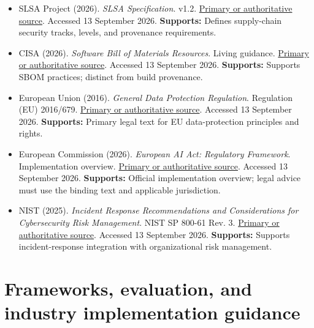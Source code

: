 \begin{itemize}
\item {}\textbf{} SLSA Project (2026). \emph{SLSA Specification}. v1.2. \href{\detokenize{https://slsa.dev/spec/v1.2}}{Primary or authoritative source}. Accessed 13 September 2026. \textbf{Supports:} Defines supply-chain security tracks, levels, and provenance requirements.

\item {}\textbf{} CISA (2026). \emph{Software Bill of Materials Resources}. Living guidance. \href{\detokenize{https://www.cisa.gov/sbom}}{Primary or authoritative source}. Accessed 13 September 2026. \textbf{Supports:} Supports SBOM practices; distinct from build provenance.

\item {}\textbf{} European Union (2016). \emph{General Data Protection Regulation}. Regulation (EU) 2016/679. \href{\detokenize{https://eur-lex.europa.eu/eli/reg/2016/679/oj}}{Primary or authoritative source}. Accessed 13 September 2026. \textbf{Supports:} Primary legal text for EU data-protection principles and rights.

\item {}\textbf{} European Commission (2026). \emph{European AI Act: Regulatory Framework}. Implementation overview. \href{\detokenize{https://digital-strategy.ec.europa.eu/en/policies/regulatory-framework-ai}}{Primary or authoritative source}. Accessed 13 September 2026. \textbf{Supports:} Official implementation overview; legal advice must use the binding text and applicable jurisdiction.

\item {}\textbf{} NIST (2025). \emph{Incident Response Recommendations and Considerations for Cybersecurity Risk Management}. NIST SP 800-61 Rev. 3. \href{\detokenize{https://csrc.nist.gov/pubs/sp/800/61/r3/final}}{Primary or authoritative source}. Accessed 13 September 2026. \textbf{Supports:} Supports incident-response integration with organizational risk management.

\end{itemize}

\section{Frameworks, evaluation, and industry implementation guidance}

